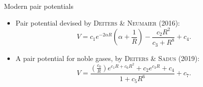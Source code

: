 \documentclass{beamer}
\def\D{\displaystyle}
\begin{document}
%
%

\begin{frame}{Modern pair potentials}
    \begin{itemize}
        \item Pair potential devised by \textsc{Deiters \& Neumaier} (2016):
            \begin{equation}
                V = c_1 e^{-2\alpha R}\left(\alpha + \frac{1}{R}\right) - \frac{c_2R^2}{c_3 + R^8} + c_4.
                \label{eq:ljlike}
            \end{equation}
        \item A pair potential for noble gases, by \textsc{Deiters \& Sadus} (2019):
            \begin{equation}
                V = \frac{\left(\D\frac{c_0}{R}\right)e^{c_1R+c_6R^2} 
                + c_2e^{c_3R} + c_4}
                {1+ c_5R^6} + c_7.
            \end{equation}
    \end{itemize}
\end{frame}
\end{document}
